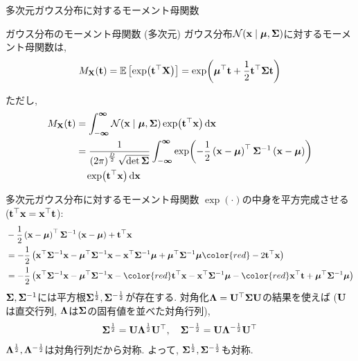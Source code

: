 \documentclass[dvipdfmx,notheorems,t]{beamer}
\begin{document}
\begin{frame}{多次元ガウス分布に対するモーメント母関数}
\begin{block}{ガウス分布のモーメント母関数 (多次元)}
  ガウス分布$\mathcal{N}(\vb{x} \mid \vb*{\mu}, \vb{\Sigma})$に対するモーメント母関数は,
  \begin{align*}
    M_{\vb{X}}(\vb{t}) = \operatorname{\mathbb{E}} \left[ \exp(\vb{t}^\top \vb{X}) \right] = \exp(\vb*{\mu}^\top \vb{t}
      + \frac{1}{2} \vb{t}^\top \vb{\Sigma} \vb{t})
  \end{align*}
\end{block}

ただし,
\begin{align*}
  M_{\vb{X}}(\vb{t}) &= \int_{-\boldsymbol{\infty}}^{\boldsymbol{\infty}}
    \mathcal{N}(\vb{x} \mid \vb*{\mu}, \vb{\Sigma}) \exp(\vb{t}^\top \vb{x}) \dd{\vb{x}} \\
  &= \frac{1}{\left( 2\pi \right)^\frac{D}{2} \sqrt{\det \vb{\Sigma}}}
    \int_{-\boldsymbol{\infty}}^{\boldsymbol{\infty}}
    \exp(-\frac{1}{2} \left( \vb{x} - \vb*{\mu} \right)^\top \vb{\Sigma}^{-1}
      \left( \vb{x} - \vb*{\mu} \right)) \\
  & \quad \exp(\vb{t}^\top \vb{x}) \dd{\vb{x}}
\end{align*}
\end{frame}

\begin{frame}{多次元ガウス分布に対するモーメント母関数}
$\exp(\cdot)$の中身を平方完成させる ($\vb{t}^\top \vb{x} = \vb{x}^\top \vb{t}$):
\begin{align*}
  & -\frac{1}{2} \left( \vb{x} - \vb*{\mu} \right)^\top \vb{\Sigma}^{-1}
    \left( \vb{x} - \vb*{\mu} \right) + \vb{t}^\top \vb{x} \\
  &= -\frac{1}{2} \left( \vb{x}^\top \vb{\Sigma}^{-1} \vb{x}
    - \vb*{\mu}^\top \vb{\Sigma}^{-1} \vb{x}
    - \vb{x}^\top \vb{\Sigma}^{-1} \vb*{\mu}
    + \vb*{\mu}^\top \vb{\Sigma}^{-1} \vb*{\mu} {\color{red} - 2 \vb{t}^\top \vb{x}} \right) \\
  &= -\frac{1}{2} \left( \vb{x}^\top \vb{\Sigma}^{-1} \vb{x}
    - \vb*{\mu}^\top \vb{\Sigma}^{-1} \vb{x} - {\color{red} \vb{t}^\top \vb{x}}
    - \vb{x}^\top \vb{\Sigma}^{-1} \vb*{\mu} - {\color{red} \vb{x}^\top \vb{t}}
    + \vb*{\mu}^\top \vb{\Sigma}^{-1} \vb*{\mu} \right)
\end{align*}
$\vb{\Sigma}, \vb{\Sigma}^{-1}$には平方根$\vb{\Sigma}^{\frac{1}{2}}, \vb{\Sigma}^{-\frac{1}{2}}$が存在する.
対角化$\vb{\Lambda} = \vb{U}^\top \vb{\Sigma} \vb{U}$の結果を使えば
($\vb{U}$は直交行列, $\vb{\Lambda}$は$\vb{\Sigma}$の固有値を並べた対角行列),
\begin{gather*}
  \vb{\Sigma}^\frac{1}{2} = \vb{U} \vb{\Lambda}^\frac{1}{2} \vb{U}^\top, \quad
  \vb{\Sigma}^{-\frac{1}{2}} = \vb{U} \vb{\Lambda}^{-\frac{1}{2}} \vb{U}^\top
\end{gather*}
$\vb{\Lambda}^\frac{1}{2}, \vb{\Lambda}^{-\frac{1}{2}}$は対角行列だから対称.
よって, $\vb{\Sigma}^{\frac{1}{2}}, \vb{\Sigma}^{-\frac{1}{2}}$も対称.
\end{frame}
\end{document}
